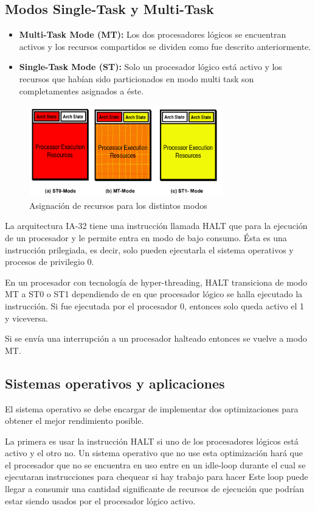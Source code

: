 \subsection{Modos Single-Task y Multi-Task}
\begin{itemize}
	\item \textbf{Multi-Task Mode (MT):} Los dos procesadores lógicos se encuentran activos y los recursos compartidos se dividen como fue descrito anteriormente.
	\item \textbf{Single-Task Mode (ST):} Solo un procesador lógico está activo y los recursos que habían sido particionados en modo multi task son completamentes asignados a éste.
\end{itemize}
\begin{figure}[ht]
	\centering
	\includegraphics[width=0.75\textwidth]{imagenes/single-multi-task-modes}
	\caption{Asignación de recursos para los distintos modos}
	\label{fig:xenonSingleMultiTaskModes}
\end{figure}
La arquitectura IA-32 tiene una instrucción llamada HALT que para la ejecución de un procesador y le permite entra en modo de bajo consumo. Ésta es una instrucción prilegiada, es decir, solo pueden ejecutarla el sistema operativos y procesos de privilegio 0.

En un procesador con tecnología de hyper-threading, HALT transiciona de modo MT a ST0 o ST1 dependiendo de en que procesador lógico se halla ejecutado la instrucción. Si fue ejecutada por el procesador 0, entonces solo queda activo el 1 y viceversa.

Si se envía una interrupción a un procesador halteado entonces se vuelve a modo MT.

\subsection{Sistemas operativos y aplicaciones}
El sistema operativo se debe encargar de implementar dos optimizaciones para obtener el mejor rendimiento posible.

La primera es usar la instrucción HALT si uno de los procesadores lógicos está activo y el otro no. Un sistema operativo que no use esta optimización hará que el procesador que no se encuentra en uso entre en un idle-loop durante el cual se ejecutaran instrucciones para chequear si hay trabajo para hacer Este loop puede llegar a consumir una cantidad significante de recursos de ejecución que podrían estar siendo usados por el procesador lógico activo.

